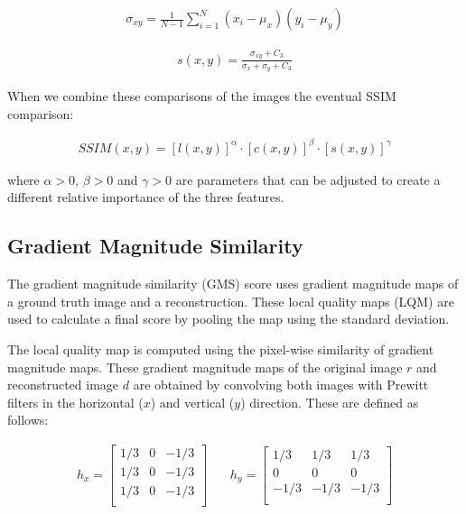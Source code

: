 \begin{align}
    \sigma_{xy} = \frac{ 1 }{ N - 1 } \sum^N_{i=1}{(x_i - \mu_x)(y_i - \mu_y)} 
\end{align}

\begin{align}
    s(x, y) = \frac{ \sigma_{xy} + C_3 }{ \sigma_x + \sigma_y + C_3}
\end{align}

When we combine these comparisons of the images the eventual SSIM comparison:

\begin{align}
    SSIM(x, y) = [l(x,y)]^\alpha \cdot [c(x,y)]^\beta \cdot [s(x,y)]^\gamma
\end{align}

where $\alpha > 0$, $\beta > 0$ and $\gamma > 0$ are parameters that can be adjusted to create a different relative importance of the three features.


\subsection{Gradient Magnitude Similarity}

The gradient magnitude similarity (GMS) score uses gradient magnitude maps of a ground truth image and a reconstruction. These local quality maps (LQM) are used to calculate a final score by pooling the map using the standard deviation.

The local quality map is computed using the pixel-wise similarity of gradient magnitude maps. These gradient magnitude maps of the original image $r$ and reconstructed image $d$ are obtained by convolving both images with Prewitt filters in the horizontal ($x$) and vertical ($y$) direction. These are defined as follows:

\begin{align}
    h_x =
  \left[ {\begin{array}{ccc}
    1/3 & 0 & -1/3\\
    1/3 & 0 & -1/3\\
    1/3 & 0 & -1/3\\
  \end{array} } \right]
  & \, &
    h_y =
  \left[ {\begin{array}{ccc}
    1/3 & 1/3 & 1/3\\
    0 & 0 & 0\\
    -1/3 & -1/3 & -1/3\\
  \end{array} } \right]
\end{align}

